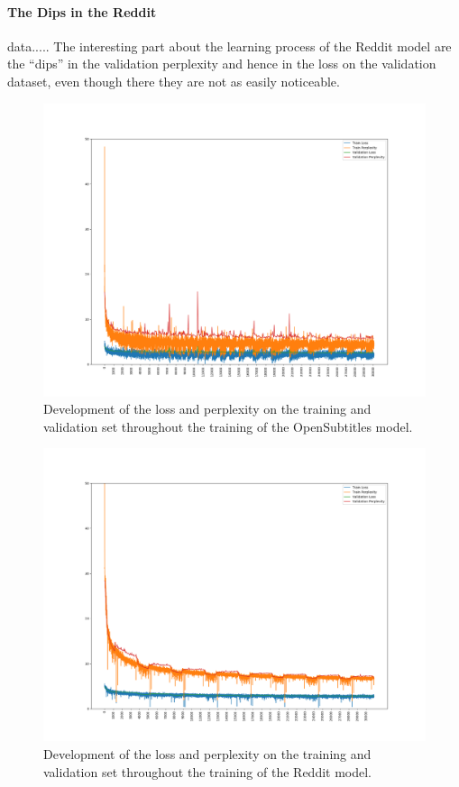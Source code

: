 \paragraph{The Dips in the Reddit} data..... The interesting part about the learning process of the Reddit model are the ``dips'' in the validation perplexity and hence in the loss on the validation dataset, even though there they are not as easily noticeable.
\begin{figure}[H]
	\includegraphics[width=\linewidth]{img/plots/opensubtitles_not_reversed/train_metrics.png}
	\caption{Development of the loss and perplexity on the training and validation set throughout the training of the OpenSubtitles model.}
	\label{results:learning_process:metrics:opensubtitles}
\end{figure}

\begin{figure}[H]
	\includegraphics[width=\linewidth]{img/plots/reddit/train_metrics.png}
	\caption{Development of the loss and perplexity on the training and validation set throughout the training of the Reddit model.}
	\label{results:learning_process:metrics:reddit}
\end{figure}

